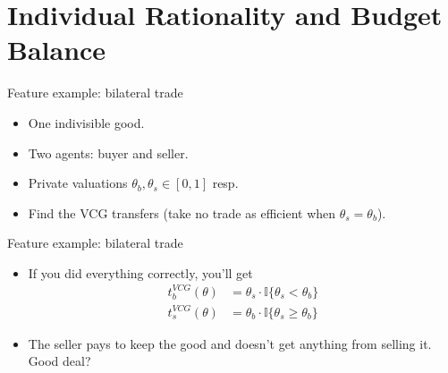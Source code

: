 \documentclass[english,10pt
,aspectratio=169
]{beamer}
\begin{document}
\section{Individual Rationality and Budget Balance}

\begin{frame}{Feature example: bilateral trade}
\begin{example}
	\begin{itemize}
		\item One indivisible good.
		\item Two agents: buyer and seller. 
		\item Private valuations $\theta_b,\theta_s \in [0,1]$ resp.
		\item Find the VCG transfers (take no trade as efficient when $\theta_s = \theta_b$).
	\end{itemize}
\end{example}
\end{frame}


\begin{frame}{Feature example: bilateral trade}
\begin{itemize}
	\item If you did everything correctly, you'll get
	\begin{align*}
		t_b^{VCG}(\theta) &= \theta_s \cdot \mathbb{I} \{ \theta_s < \theta_b \} 
		\\ t_s^{VCG}(\theta) &= \theta_b \cdot \mathbb{I} \{ \theta_s \geq \theta_b \} 
	\end{align*}
	\pause
	\item The seller pays to keep the good and doesn't get anything from selling it. Good deal?
\end{itemize}
\end{frame}
\end{document}
